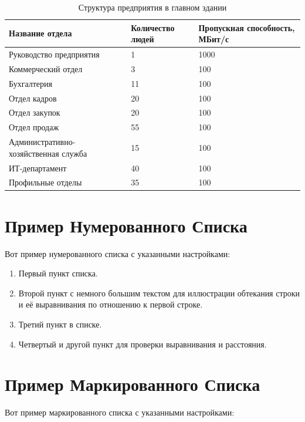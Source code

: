 \documentclass[14pt, a4paper]{extarticle}
\begin{document}
\begin{table}[H]
\centering
\small
\caption{Структура предприятия в главном здании}
\begin{tabular}{|m{5cm}|m{3cm}|m{3cm}|}
\hline
\textbf{Название отдела} & \textbf{Количество людей} & \textbf{Пропускная способность, МБит/с} \\
\hline
Руководство предприятия & 1 & 1000 \\
\hline
Коммерческий отдел & 3 & 100 \\
\hline
Бухгалтерия & 11 & 100 \\
\hline
Отдел кадров & 20 & 100 \\
\hline
Отдел закупок & 20 & 100 \\
\hline
Отдел продаж & 55 & 100 \\
\hline
Административно-хозяйственная служба & 15 & 100 \\
\hline
ИТ-департамент & 40 & 100 \\
\hline
Профильные отделы & 35 & 100 \\
\hline
\end{tabular}
\label{table:1:mainDepStructure}
\end{table}


\section{Пример Нумерованного Списка}

Вот пример нумерованного списка с указанными настройками:

\begin{enumerate}
    \item Первый пункт списка.
    \item Второй пункт с немного большим текстом для иллюстрации обтекания строки и её выравнивания по отношению к первой строке.
    \item Третий пункт в списке.
    \item Четвертый и другой пункт для проверки выравнивания и расстояния.
\end{enumerate} 

\section{Пример Маркированного Списка}
Вот пример маркированного списка с указанными настройками:
\end{document}
